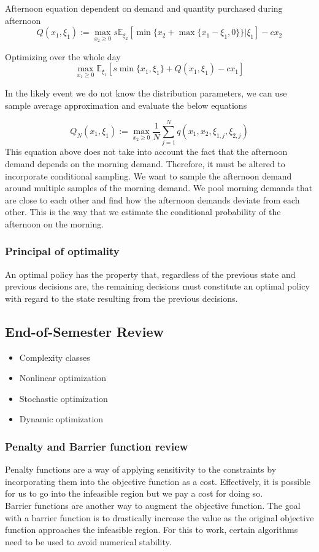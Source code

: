 Afternoon equation dependent on demand and quantity purchased during afternoon
\begin{equation}
  Q(x_1, \xi_1) := \max_{x_2 \geq 0} s \mathbb{E}_{\xi_2}[\min\{ x_2 + \max\{x_1 - \xi_1, 0\}\}| \xi_1] - c x_2
\end{equation}

Optimizing over the whole day 
\begin{equation}
  \max_{x_1 \geq 0} \mathbb{E}_{\xi_1} [s \min\{x_1, \xi_1\} + Q(x_1, \xi_1) - cx_1]
\end{equation}

In the likely event we do not know the distribution parameters, we can use sample average approximation and evaluate the below equations

\begin{equation}
  Q_N(x_1, \xi_1) := \max_{x_2 \geq 0} \frac{1}{N} \sum_{j=1}^{N} q(x_1,x_2,\xi_{1,j}, \xi_{2,j})
\end{equation}
This equation above does not take into account the fact that the afternoon demand depends on the morning demand. Therefore, it must be altered to incorporate conditional sampling. We want to sample the afternoon demand around multiple samples of the morning demand. We pool morning demands that are close to each other and find how the afternoon demands deviate from each other. This is the way that we estimate the conditional probability of the afternoon on the morning.

\subsubsection{Principal of optimality}
An optimal policy has the property that, regardless of the previous state and previous decisions are, the remaining decisions must constitute an optimal policy with regard to the state resulting from the previous decisions.

\subsection{End-of-Semester Review}
\begin{itemize}
  \item Complexity classes
  \item Nonlinear optimization
  \item Stochastic optimization
  \item Dynamic optimization
\end{itemize}
\subsubsection{Penalty and Barrier function review}
Penalty functions are a way of applying sensitivity to the constraints by incorporating them into the objective function as a cost. Effectively, it is possible for us to go into the infeasible region but we pay a cost for doing so.
\\ 
Barrier functions are another way to augment the objective function. The goal with a barrier function is to drastically increase the value as the original objective function approaches the infeasible region. For this to work, certain algorithms need to be used to avoid numerical stability.

